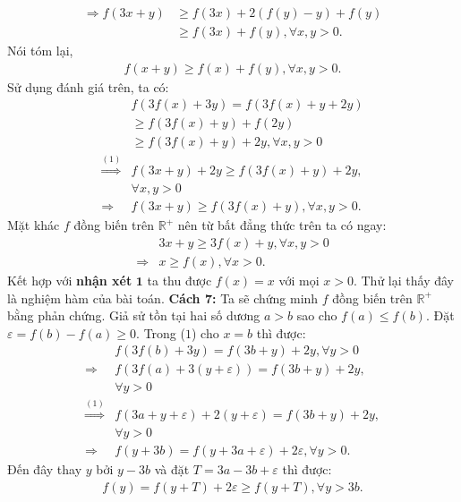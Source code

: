 \begin{multicols}{2}
\begin{align*}
		\Rightarrow f(3x + y) &\ge f(3x) \!+\! 2(f(y) \!-\! y) \!+\! f(y)\\
		&\ge f(3x) + f(y),\forall x,y > 0.
	\end{align*}
	Nói tóm lại, 
	\begin{align*}
		f(x + y) \ge f(x) + f(y),\forall x,y > 0.
	\end{align*}
	Sử dụng đánh giá trên, ta có: 
	\begin{align*}
		&f(3f(x) + 3y) = f(3f(x) + y + 2y)\\
		&\ge f(3f(x) + y) + f(2y)\\
		&\ge f(3f(x) + y) + 2y,\forall x,y > 0\\
		\mathop  \Rightarrow \limits^{(1)} &f(3x + y) + 2y \ge f(3f(x) + y) + 2y,\\
		&\forall x,y > 0\\
		\Rightarrow &f(3x + y) \ge f(3f(x) + y),\forall x,y > 0.
	\end{align*}
	Mặt khác $f$  đồng biến trên $\mathbb{R^+}$  nên từ bất đẳng thức trên ta có ngay: 
	\begin{align*}
		&3x + y \ge 3f(x) + y,\forall x,y > 0\\
		\Rightarrow &x \ge f(x),\forall x > 0.
	\end{align*}
	Kết hợp với \textbf{\color{hoccungpi}nhận xét} $\pmb1$ ta thu được $f(x) = x$ với mọi $x > 0$.   Thử lại thấy đây là nghiệm hàm của bài toán.
	\vskip 0.1cm
	\textbf{\color{hoccungpi}Cách $\pmb7$:}
	\vskip 0.1cm  
	Ta sẽ chứng minh $f$  đồng biến trên $\mathbb{R^+}$  bằng phản chứng. 
	\vskip 0.1cm
	Giả sử tồn tại hai số dương $a> b$  sao cho $f(a) \le f(b).$  Đặt  $\varepsilon  = f(b) - f(a) \ge 0.$
	\vskip 0.1cm
	Trong ($1$) cho  $x = b$ thì được: 
	\begin{align*}
		&f(3f(b) + 3y) = f(3b + y) + 2y,\forall y > 0\\
		\Rightarrow &f(3f(a) + 3(y + \varepsilon )) = f(3b + y) + 2y,\\
		&\forall y > 0\\
		\mathop  \Rightarrow \limits^{(1)} &f(3a \!+\! y \!+\! \varepsilon ) \!+\! 2(y \!+\! \varepsilon ) \!=\! f(3b \!+\! y) \!+\! 2y,\\
		&\forall y > 0\\
		\Rightarrow &f(y + 3b) = f(y + 3a + \varepsilon ) + 2\varepsilon ,\forall y > 0.
	\end{align*}
	Đến đây thay $y$  bởi $y - 3b$  và đặt $T = 3a - 3b + \varepsilon$  thì được: 
	\begin{align*}
		f(y) = f(y \!+\! T) \!+\! 2\varepsilon  \ge f(y \!+\! T),\forall y \!>\! 3b.	

\end{align*}
\end{multicols}
